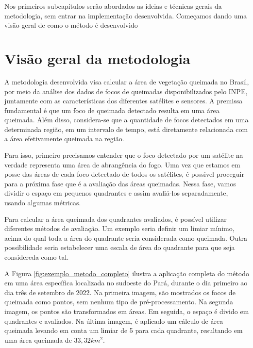 \documentclass[cic,tc]{iiufrgs}
\begin{document}
Nos primeiros subcapítulos serão abordados as ideias e técnicas gerais da metodologia, sem entrar na implementação desenvolvida. Começamos dando uma visão geral de como o método é desenvolvido

\section{Visão geral da metodologia}

A metodologia desenvolvida visa calcular a área de vegetação queimada no Brasil, por meio da análise dos dados de focos de queimadas disponibilizados pelo INPE, juntamente com as características dos diferentes satélites e sensores. A premissa fundamental é que um foco de queimada detectado resulta em uma área queimada. Além disso, considera-se que a quantidade de focos detectados em uma determinada região, em um intervalo de tempo, está diretamente relacionada com a área efetivamente queimada na região. \par 

Para isso, primeiro precisamos entender que o foco detectado por um satélite na verdade representa uma área de abrangência do fogo. Uma vez que estamos em posse das áreas de cada foco detectado de todos os satélites, é possivel proceguir para a próxima fase que é a avaliação das áreas queimadas. Nessa fase, vamos dividir o espaço em pequenos quadrantes e assim avaliá-los separadamente, usando algumas métricas. \par

Para calcular a área queimada dos quadrantes avaliados, é possível utilizar diferentes métodos de avaliação. Um exemplo seria definir um limiar mínimo, acima do qual toda a área do quadrante seria considerada como queimada. Outra possibilidade seria estabelecer uma escala de área do quadrante para que seja considereda como tal. \par

A Figura \ref{fig:exemplo_metodo_completo} ilustra a aplicação completa do método em uma área específica localizada no sudoeste do Pará, durante o dia primeiro ao dia três de setembro de 2022. Na primeira imagem, são mostrados os focos de queimada como pontos, sem nenhum tipo de pré-processamento. Na segunda imagem, os pontos são transformados em áreas. Em seguida, o espaço é divido em quadrantes e avaliados. Na última imagem, é aplicado um cálculo de área queimada levando em conta um limiar de 5 para cada quadrante, resultando em uma área queimada de $33,32 km^2$. \par
\end{document}
